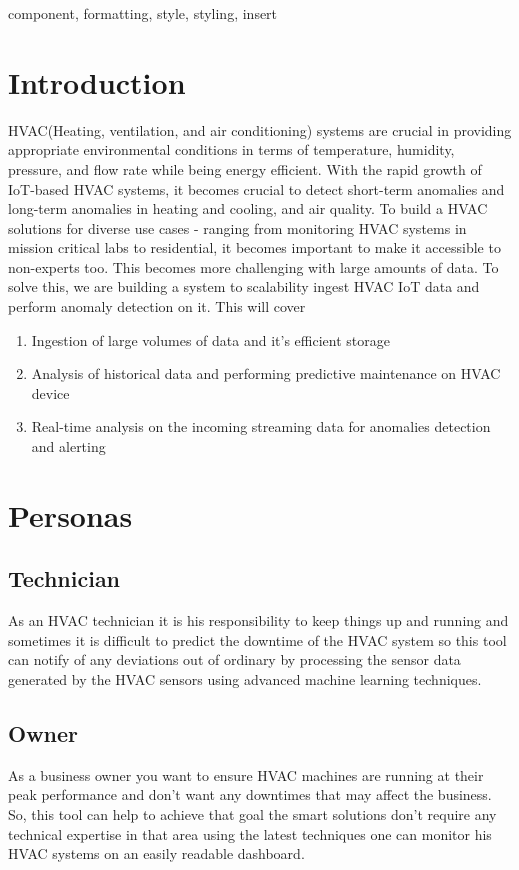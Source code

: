 \documentclass[conference]{IEEEtran}
\begin{document}
\begin{IEEEkeywords}
component, formatting, style, styling, insert
\end{IEEEkeywords}

\section{Introduction}

HVAC(Heating, ventilation, and air conditioning) systems are crucial in providing appropriate environmental conditions in terms of temperature, humidity, pressure, and flow rate while being energy efficient. With the rapid growth of IoT-based HVAC systems, it becomes crucial to detect short-term anomalies and long-term anomalies in heating and cooling, and air quality. To build a HVAC solutions for diverse use cases - ranging from monitoring HVAC systems in mission critical labs to residential, it becomes important to make it accessible to non-experts too. This becomes more challenging with large amounts of data. To solve this, we are building a system to scalability ingest HVAC IoT data and perform anomaly detection on it. This will cover \begin{enumerate}
    \item Ingestion of large volumes of data and it's efficient storage
    \item Analysis of historical data and performing predictive maintenance on HVAC device
    \item Real-time analysis on the incoming streaming data for anomalies detection and alerting  
\end{enumerate}


\section{Personas}
\subsection{Technician}
As an HVAC technician it is his responsibility to keep things up and running and sometimes it is difficult to predict the downtime of the HVAC system so this tool can notify of any deviations out of ordinary by processing the sensor data generated by the HVAC sensors using advanced machine learning techniques.

\subsection{Owner}
As a business owner you want to ensure HVAC machines are running at their peak performance and don’t want any downtimes that may affect the business. So, this tool can help to achieve that goal the smart solutions don’t require any technical expertise in that area using the latest techniques one can monitor his HVAC systems on an easily readable dashboard.
\end{document}
